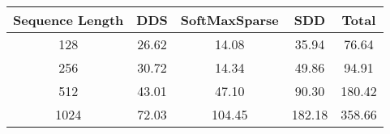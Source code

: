 \begin{table*}[t]
\begin{subtable}{\textwidth}
\begin{tabular}{||c|c c c|c||}
\hline
\end{tabular}
\caption{Random-sparse attention on GPU}
\end{subtable}
\begin{subtable}{\textwidth}\centering
\begin{tabular}{||c|ccc|c||}
\hline
Sequence Length & DDS & SoftMaxSparse & SDD & Total \\ [0.5ex] 
\hline\hline

128 & 26.62 & 14.08 & 35.94 & 76.64 \\
256 & 30.72 & 14.34 & 49.86 & 94.91 \\
512 & 43.01 & 47.10 & 90.30 & 180.42 \\
1024 & 72.03 & 104.45 & 182.18 & 358.66 \\

\hline
\end{tabular}
\caption{Global-sparse attention on GPU}
\end{subtable}
\caption{Breakdown and total execution time of attention for the naive (full) attention on CPU and GPU, and three different sparse attention modes on GPU. All experiments used \texttt{num head = 8}, \texttt{D = 512}, and \texttt{TS = 8} (if applicable). All values are in microseconds.}
\label{table:main_exp}
\end{table*}